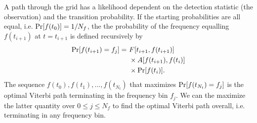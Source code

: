 \documentclass[paper-main.tex]{subfiles}
\begin{document}
A path through the grid has a likelihood dependent on the detection statistic (the observation) and the transition probability.
If the starting probabilities are all equal, i.e. ${\rm Pr}[f(t_0)] = 1/N_f$, the the probability of the frequency equalling $f(t_{i+1})$ at $t = t_{i+1}$ is defined recursively by
\begin{eqnarray}
{\rm Pr}[f(t_{i+1})=f_j] =~& F[t_{i+1},f(t_{i+1})] \nonumber \\
                     &\times A[f(t_{i+1}),f(t_i)]  \nonumber \\
                     &\times {\rm Pr}[f(t_i)].
\label{eqn:recursiveViterbi}
\end{eqnarray}
The sequence $f(t_0),f(t_1),\dots,f(t_{N_t})$ that maximizes ${\rm Pr}[f(t_{N_t}) = f_j]$ is the optimal Viterbi path terminating in the frequency bin $f_j$. 
We can the maximize the latter quantity over $0 \leq j \leq N_f$ to find the optimal Viterbi path overall, i.e. terminating in any frequency bin. 
\end{document}
